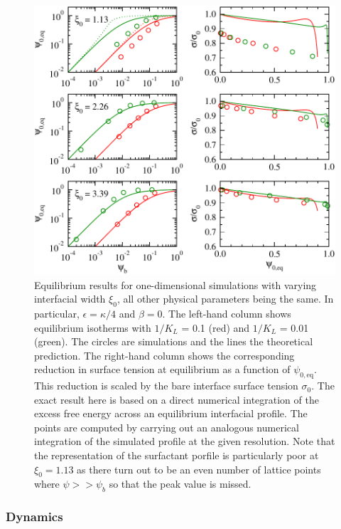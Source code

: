 \begin{figure}
\begin{center}
\includegraphics{surfactant_fig1-eps-converted-to.pdf}
\end{center}
\caption{Equilibrium results for one-dimensional simulations with
varying interfacial width $\xi_0$, all other physical parameters
being the same. In particular, $\epsilon = \kappa/4$ and $\beta = 0$.
The
left-hand column shows equilibrium isotherms with $1/K_L$ = 0.1 (red)
and $1/K_L$ = 0.01 (green). The circles are simulations and the lines
the theoretical prediction. The right-hand column shows the
corresponding reduction in surface tension at equilibrium
as a function of $\psi_{0,\mathrm{eq}}$. This reduction is scaled by
the bare interface surface tension $\sigma_0$. The exact result here
is based on a direct numerical integration of the excess free energy
across an equilibrium interfacial profile. The points are computed
by carrying out an analogous numerical integration of the simulated
profile at the given resolution. Note that the representation of
the surfactant porfile is particularly poor at $\xi_0 = 1.13$ as
there turn out to be an even number of lattice points where
$\psi >> \psi_b$ so that the peak value is missed.}
\end{figure}



\subsubsection{Dynamics}

